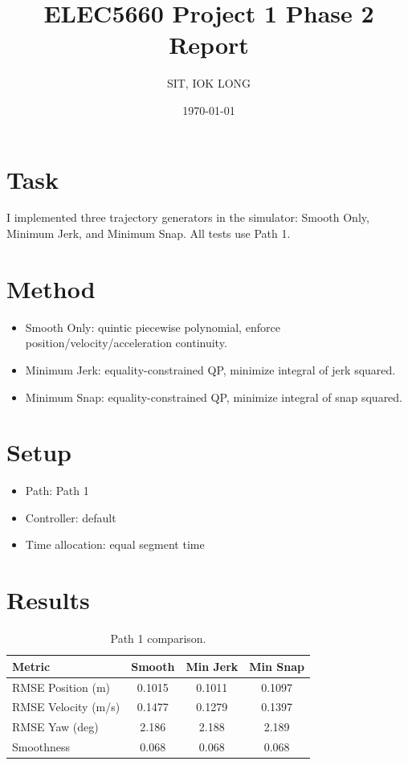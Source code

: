 \documentclass[11pt]{article}
\title{ELEC5660 Project 1 Phase 2 Report}
\author{SIT, IOK LONG}
\date{\today}
\begin{document}
\maketitle

\section{Task}
I implemented three trajectory generators in the simulator:
Smooth Only, Minimum Jerk, and Minimum Snap.
All tests use Path 1.

\section{Method}
\begin{itemize}
\item Smooth Only: quintic piecewise polynomial, enforce position/velocity/acceleration continuity.
\item Minimum Jerk: equality-constrained QP, minimize integral of jerk squared.
\item Minimum Snap: equality-constrained QP, minimize integral of snap squared.
\end{itemize}

\section{Setup}
\begin{itemize}
\item Path: Path 1
\item Controller: default
\item Time allocation: equal segment time
\end{itemize}

\section{Results}

\begin{table}[H]
\centering
\begin{tabular}{lccc}
\toprule
Metric & Smooth & Min Jerk & Min Snap \\
\midrule
RMSE Position (m) & 0.1015 & 0.1011 & 0.1097 \\
RMSE Velocity (m/s) & 0.1477 & 0.1279 & 0.1397 \\
RMSE Yaw (deg) & 2.186 & 2.188 & 2.189 \\
Smoothness & 0.068 & 0.068 & 0.068 \\
\bottomrule
\end{tabular}
\caption{Path 1 comparison.}
\end{table}
\end{document}

